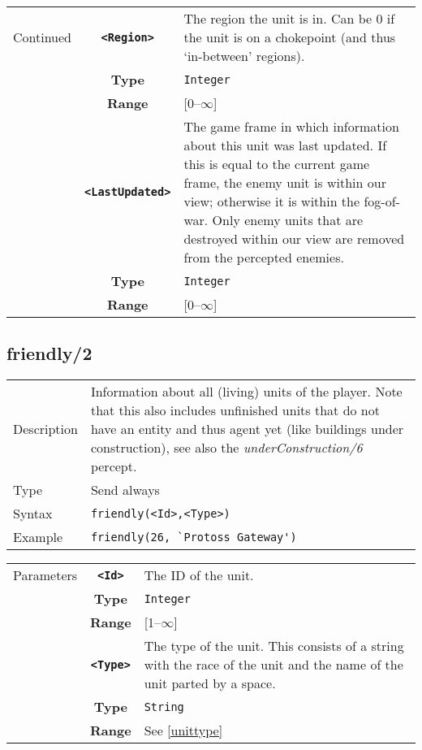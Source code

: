 \begin{tabularx}{\textwidth}{l | c | p{8cm}|}
 \cline{2-3}
 Continued  & \textbf{\verb|<Region>|} & The region the unit is in. Can be 0 if the unit is on a chokepoint (and thus `in-between' regions).\\
            & \textbf{Type} & \verb|Integer| \\
            & \textbf{Range} & [0--$\infty$] \\
            \cline{2-3}
            & \textbf{\verb|<LastUpdated>|} & The game frame in which information about this unit was last updated. If this is equal to the current game frame, the enemy unit is within our view; otherwise it is within the fog-of-war. Only enemy units that are destroyed within our view are removed from the percepted enemies.\\
            & \textbf{Type} & \verb|Integer| \\
            & \textbf{Range} & [0--$\infty$] \\
            \cline{2-3}
\end{tabularx}
\subsection{friendly/2}
\begin{tabularx}{\textwidth}{lX}
 Description & Information about all (living) units of the player. Note that this also includes unfinished units that do not have an entity and thus agent yet (like buildings under construction), see also the \textit{underConstruction/6} percept. \\
 Type & Send always \\
 Syntax & \verb|friendly(<Id>,<Type>)| \\
 Example & \verb|friendly(26, `Protoss Gateway')| \\
 \end{tabularx}
 \begin{tabularx}{\textwidth}{l | c | p{8cm}|}
 \cline{2-3}
 Parameters
            & \textbf{\verb|<Id>|} & The ID of the unit.\\
            & \textbf{Type} & \verb|Integer| \\
            & \textbf{Range} & [1--$\infty$] \\
            \cline{2-3}
            & \textbf{\verb|<Type>|} & The type of the unit. This consists of a string with the race of the unit and the name of the unit parted by a space. \\
            & \textbf{Type} & \verb|String| \\
            & \textbf{Range} & See \ref{unittype} \\
            \cline{2-3}
\end{tabularx}

